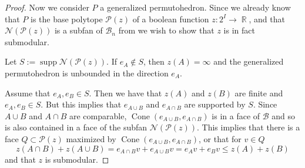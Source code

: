 \documentclass[12pt]{amsart}
\numberwithin{equation}{section}
\DeclareMathOperator{\supp}{ supp}
\newcommand{\C}{\operatorname{Cone}}
\newcommand{\RR}{\operatorname{\mathbb{R}}}
\newcommand{\bb}{\mathcal{B}}
\begin{document}
\begin{proof}
Now we consider $P$ a generalized permutohedron.  Since we already
know that $P$ is the base polytope $\mathcal{P}(z)$ of a boolean function $z:2^{I}\rightarrow \RR$, and that 
$\mathcal{N}(\mathcal{P}(z))$ is a subfan of $\bb_n$ from \cite{HopfMonoid} we wish
to show that $z$ is in fact submodular. 

  Let $S:= \supp\mathcal{N}(\mathcal{P}(z))$.  If $e_A\notin S$, 
then $z(A)=\infty$ and the generalized permutohedron is unbounded in the direction $e_A.$ 

Assume that $e_A ,e_B\in S$.  Then we have that $z(A)$ and $z(B)$ are finite and $e_A, e_B\in S$. But this implies that $e_{A\cup B}$ and $e_{A\cap B}$  are supported
by $S$.   Since $A\cup B$ and $A\cap B$ are comparable, $\C (e_{A\cup B}, e_{A\cap B})$ 
is in a face of  $\bb$ and so is also contained in a face of the subfan $\mathcal{N}(\mathcal{P}(z))$.   
This implies that there is a face $Q\subset \mathcal{P}(z)$ maximized by $\C (e_{A\cup B}, e_{A\cap B})$, 
or that for $v\in Q$ 
$$z(A\cap B) + z( A \cup B) = e_{A\cap B}v + e_{A \cup B}v = e_A v + e_B v \leq z(A) + z(B)$$
and that $z$ is submodular.    
  

\end{proof}
\end{document}
